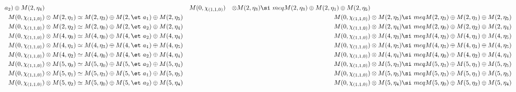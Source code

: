 \begin{align*}
a_{2}) \oplus M(2,\eta_{4}) &&& M(0,\chi_{(1,1,0)}) &\otimes M(2,\eta_{3}) \si\
meq M(2,\eta_{3}) \oplus M(2,\eta_{1}) \oplus M(2,\eta_{5})\\
M(0,\chi_{(1,1,0)}) &\otimes M(2,\eta_{1}) \simeq M(2,\eta_{3}) \oplus M(2,\et\
a_{1}) \oplus M(2,\eta_{5}) &&& M(0,\chi_{(1,1,0)}) &\otimes M(2,\eta_{5}) \si\
meq M(2,\eta_{3}) \oplus M(2,\eta_{1}) \oplus M(2,\eta_{5})\\
M(0,\chi_{(1,1,0)}) &\otimes M(2,\eta_{2}) \simeq M(2,\eta_{0}) \oplus M(2,\et\
a_{2}) \oplus M(2,\eta_{4}) &&& M(0,\chi_{(1,1,0)}) &\otimes M(2,\eta_{4}) \si\
meq M(2,\eta_{0}) \oplus M(2,\eta_{2}) \oplus M(2,\eta_{4})\\
M(0,\chi_{(1,1,0)}) &\otimes M(4,\eta_{0}) \simeq M(4,\eta_{0}) \oplus M(4,\et\
a_{2}) \oplus M(4,\eta_{4}) &&& M(0,\chi_{(1,1,0)}) &\otimes M(4,\eta_{3}) \si\
meq M(4,\eta_{3}) \oplus M(4,\eta_{1}) \oplus M(4,\eta_{5})\\
M(0,\chi_{(1,1,0)}) &\otimes M(4,\eta_{1}) \simeq M(4,\eta_{3}) \oplus M(4,\et\
a_{1}) \oplus M(4,\eta_{5}) &&& M(0,\chi_{(1,1,0)}) &\otimes M(4,\eta_{5}) \si\
meq M(4,\eta_{3}) \oplus M(4,\eta_{1}) \oplus M(4,\eta_{5})\\
M(0,\chi_{(1,1,0)}) &\otimes M(4,\eta_{2}) \simeq M(4,\eta_{0}) \oplus M(4,\et\
a_{2}) \oplus M(4,\eta_{4}) &&& M(0,\chi_{(1,1,0)}) &\otimes M(4,\eta_{4}) \si\
meq M(4,\eta_{0}) \oplus M(4,\eta_{2}) \oplus M(4,\eta_{4})\\
M(0,\chi_{(1,1,0)}) &\otimes M(5,\eta_{0}) \simeq M(5,\eta_{0}) \oplus M(5,\et\
a_{2}) \oplus M(5,\eta_{4}) &&& M(0,\chi_{(1,1,0)}) &\otimes M(5,\eta_{3}) \si\
meq M(5,\eta_{3}) \oplus M(5,\eta_{1}) \oplus M(5,\eta_{5})\\
M(0,\chi_{(1,1,0)}) &\otimes M(5,\eta_{1}) \simeq M(5,\eta_{3}) \oplus M(5,\et\
a_{1}) \oplus M(5,\eta_{5}) &&& M(0,\chi_{(1,1,0)}) &\otimes M(5,\eta_{5}) \si\
meq M(5,\eta_{3}) \oplus M(5,\eta_{1}) \oplus M(5,\eta_{5})\\
M(0,\chi_{(1,1,0)}) &\otimes M(5,\eta_{2}) \simeq M(5,\eta_{0}) \oplus M(5,\et\
a_{2}) \oplus M(5,\eta_{4}) &&& M(0,\chi_{(1,1,0)}) &\otimes M(5,\eta_{4}) \si\
meq M(5,\eta_{0}) \oplus M(5,\eta_{2}) \oplus M(5,\eta_{4})\\
\end{align*}

